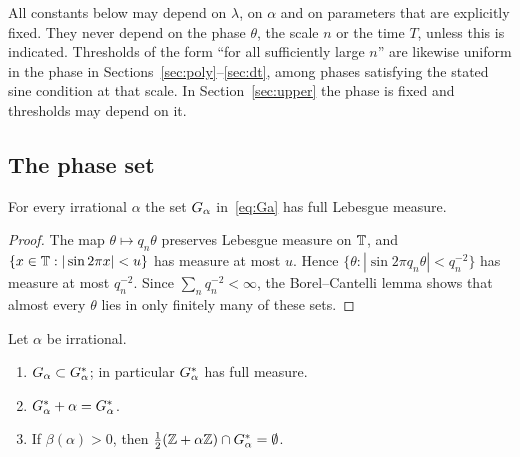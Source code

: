 All constants below may depend on $\lambda$, on $\alpha$ and on parameters that are explicitly fixed. They never depend on the phase $\theta$, the scale $n$ or the time $T$, unless this is indicated. Thresholds of the form ``for all sufficiently large $n$'' are likewise uniform in the phase in Sections~\ref{sec:poly}--\ref{sec:dt}, among phases satisfying the stated sine condition at that scale. In Section~\ref{sec:upper} the phase is fixed and thresholds may depend on it.

\subsection{The phase set}

\begin{lemma}\label{lem:Ga}
For every irrational $\alpha$ the set $G_\alpha$ in~\eqref{eq:Ga} has full Lebesgue measure.
\end{lemma}

\begin{proof}
The map $\theta\mapsto q_n\theta$ preserves Lebesgue measure on $\mathbb T$, and $\{x\in\mathbb T:|\sin 2\pi x|<u\}$ has measure at most $u$. Hence $\{\theta:|\sin 2\pi q_n\theta|<q_n^{-2}\}$ has measure at most $q_n^{-2}$. Since $\sum_nq_n^{-2}<\infty$, the Borel--Cantelli lemma shows that almost every $\theta$ lies in only finitely many of these sets.
\end{proof}

\begin{lemma}\label{lem:Gastar}
Let $\alpha$ be irrational.
\begin{enumerate}
\item $G_\alpha\subset G_\alpha^*$; in particular $G_\alpha^*$ has full measure.
\item $G_\alpha^*+\alpha=G_\alpha^*$.
\item If $\beta(\alpha)>0$, then $\frac12(\mathbb Z+\alpha\mathbb Z)\cap G_\alpha^*=\emptyset$.
\end{enumerate}
\end{lemma}

